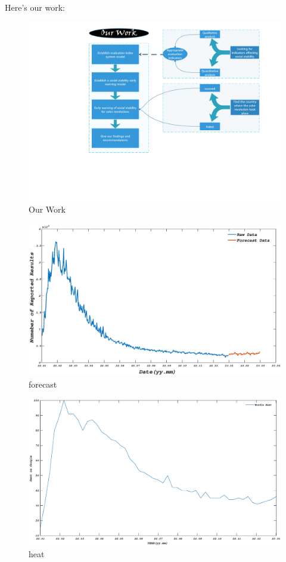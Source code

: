 \documentclass[12pt]{article}  %
\begin{document}
 Here's our work:
\begin{figure}[htbp]
\centering
\includegraphics[width=.4\textwidth]{img/our work.pdf}
\caption{Our Work}
\end{figure}
\begin{figure}[htbp]
\centering
\includegraphics[width=\textwidth]{img/yuce.eps}
\caption{forecast}
\end{figure}
\begin{figure}[htbp]
\centering
\includegraphics[width=\textwidth]{img/heat.eps}
\caption{heat}
\end{figure}
\end{document}
